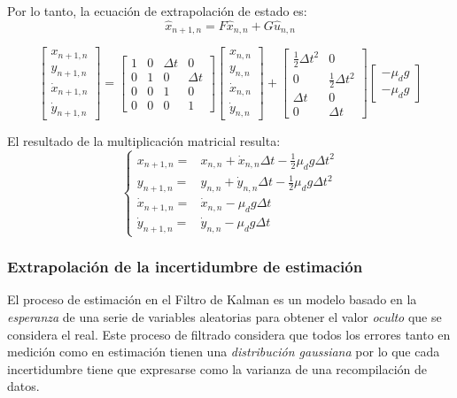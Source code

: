 Por lo tanto, la ecuación de extrapolación de estado es:
\begin{equation}
\hat{x}_{n+1,n} = F \hat{x}_{n,n} + G \hat{u}_{n,n}
\label{eq:extrapolation_equation}
\end{equation}

\begin{equation}
\begin{bmatrix}
x_{n+1,n}\\ 
y_{n+1,n}\\ 
\dot{x}_{n+1,n}\\ 
\dot{y}_{n+1,n}
\end{bmatrix}
=
\begin{bmatrix}
1 & 0 & \Delta t & 0\\ 
0 & 1 & 0 & \Delta t\\ 
0 & 0 & 1 & 0\\ 
0 & 0 & 0 & 1
\end{bmatrix}
\!
\begin{bmatrix}
x_{n,n}\\ 
y_{n,n}\\ 
\dot{x}_{n,n}\\ 
\dot{y}_{n,n}
\end{bmatrix}
+
\begin{bmatrix}
\frac{1}{2}  \Delta t ^2 & 0 \\ 
0 & \frac{1}{2} \Delta t ^2 \\ 
 \Delta t & 0 \\ 
0 & \Delta t
\end{bmatrix}
\!
\begin{bmatrix}
-\mu_d g\\
-\mu_d g
\end{bmatrix}
\end{equation}

El resultado de la multiplicación matricial resulta:
\begin{equation}
\left\{\begin{matrix}
x_{n+1, n} = & x_{n,n} + \dot{x}_{n,n} \Delta t - \frac{1}{2} \mu_d g \Delta t^2\\ 
y_{n+1, n} = & y_{n,n} + \dot{y}_{n,n} \Delta t - \frac{1}{2} \mu_d g \Delta t^2\\ 
\dot{x}_{n+1, n} = & \dot{x}_{n,n} - \mu_d g \Delta t\\ 
\dot{y}_{n+1, n} = &\dot{y}_{n,n} - \mu_d g \Delta t 
\end{matrix}\right.
\end{equation}

		\subsubsection*{Extrapolación de la incertidumbre de estimación}
	El proceso de estimación en el Filtro de Kalman es un modelo basado en la \textit{esperanza} de una serie de variables aleatorias para obtener el valor \textit{oculto} que se considera el real. Este proceso de filtrado considera que todos los errores tanto en medición como en estimación tienen una \textit{distribución gaussiana} por lo que cada incertidumbre tiene que expresarse como la varianza de una recompilación de datos.
	
